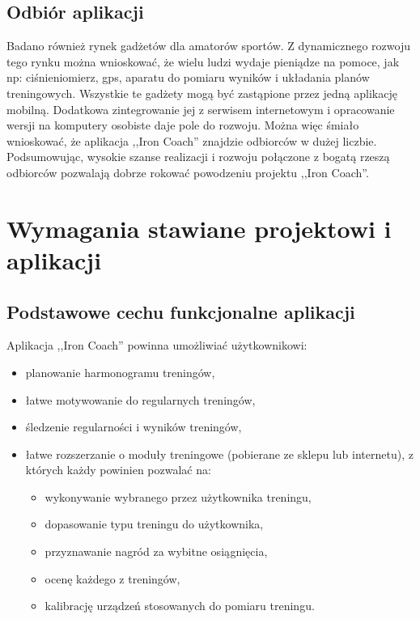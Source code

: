 \subsection{Odbiór aplikacji}
\noindent Badano również rynek gadżetów dla amatorów sportów. Z dynamicznego rozwoju tego rynku można wnioskować, że wielu ludzi wydaje pieniądze na pomoce, jak np: ciśnieniomierz, gps, aparatu do pomiaru wyników i układania planów treningowych. Wszystkie te gadżety mogą być zastąpione przez jedną aplikację mobilną. Dodatkowa zintegrowanie jej z serwisem internetowym i opracowanie wersji na komputery osobiste daje pole do rozwoju. Można więc śmiało wnioskować, że aplikacja ,,Iron Coach'' znajdzie odbiorców w dużej liczbie. \\
Podsumowując, wysokie szanse realizacji i rozwoju połączone z bogatą rzeszą odbiorców pozwalają dobrze rokować powodzeniu projektu ,,Iron Coach''.
\clearpage
\section{Wymagania stawiane projektowi i aplikacji}
\subsection{Podstawowe cechu funkcjonalne aplikacji}
\label{pfunk}
\noindent Aplikacja ,,Iron Coach'' powinna umożliwiać użytkownikowi:
\begin{itemize}
  \item planowanie harmonogramu treningów,
  \item łatwe motywowanie do regularnych treningów,
  \item śledzenie regularności i wyników treningów,
  \item łatwe rozszerzanie o moduły treningowe (pobierane ze sklepu lub internetu), z których każdy powinien pozwalać na:
    \begin{itemize}
      \item wykonywanie wybranego przez użytkownika treningu,
      \item dopasowanie typu treningu do użytkownika,
      \item przyznawanie nagród za wybitne osiągnięcia,
      \item ocenę każdego z treningów,
      \item kalibrację urządzeń stosowanych do pomiaru treningu.
    \end{itemize}
\end{itemize}
